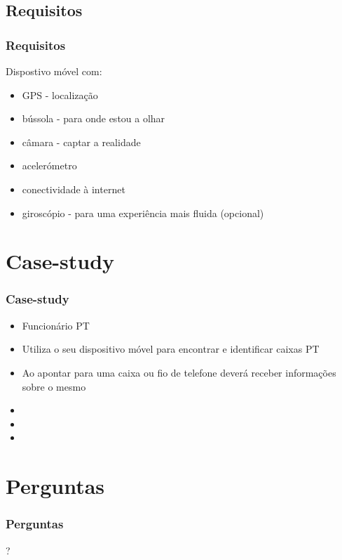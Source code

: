 \documentclass{beamer}
\begin{document}
\subsection{Requisitos}
\begin{frame} \frametitle{Requisitos}
Dispostivo móvel com:
\begin{itemize}
\pause \item GPS - localização
\pause \item bússola - para onde estou a olhar
\pause \item câmara - captar a realidade
\pause \item acelerómetro
\pause \item conectividade à internet
\pause \item giroscópio - para uma experiência mais fluida  (opcional)
\end{itemize}
\end{frame}


\section{Case-study}
\begin{frame} \frametitle{Case-study}
\begin{itemize}
\pause \item Funcionário PT
\pause \item Utiliza o seu dispositivo móvel para encontrar e identificar caixas PT
\pause \item Ao apontar para uma caixa ou fio de telefone deverá receber informações sobre o mesmo
\pause \item 
\pause \item 
\pause \item 
\end{itemize}
\end{frame}

\section*{Perguntas}
\begin{frame} \frametitle{Perguntas}
\begin{center}\huge{?}\end{center}
\end{frame}
\end{document}
